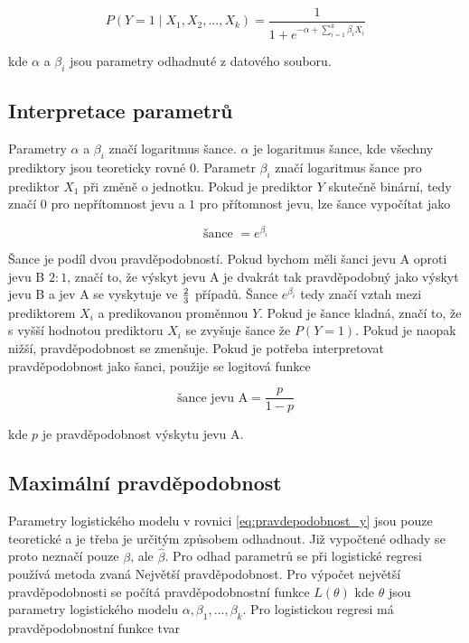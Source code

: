 \begin{equation}
    \label{eq:pravdepodobnost_y}
    P(Y = 1 \mid X_1, X_2, ..., X_k) = \frac{1}{1 + e^{-\alpha + \sum_{i=1}^k \beta_i X_i}}
\end{equation}

kde $\alpha$ a $\beta_i$ jsou parametry odhadnuté z datového souboru. 

\subsection{Interpretace parametrů}
Parametry $\alpha$ a $\beta_i$ značí logaritmus šance. $\alpha$ je  logaritmus šance, kde všechny prediktory
jsou teoreticky rovné $0$. Parametr $\beta_i$ značí logaritmus šance pro prediktor $X_1$ při změně o jednotku. 
Pokud je prediktor $Y$ skutečně binární, tedy značí $0$ pro nepřítomnost jevu a $1$ pro přítomnost jevu,
lze šance vypočítat jako

\begin{equation}
\text{šance } = e^{\beta_i}    
\end{equation}

Šance je podíl dvou pravděpodobností. Pokud bychom měli šanci jevu A oproti jevu B $2 : 1$, značí to, že výskyt jevu A je dvakrát tak pravděpodobný
jako výskyt jevu B a jev A se vyskytuje ve $2 \over 3$ případů. Šance $e^{\beta_i}$ tedy značí vztah mezi prediktorem $X_i$ a predikovanou proměnnou $Y$. Pokud je
šance kladná, značí to, že s vyšší hodnotou prediktoru $X_i$ se zvyšuje šance že $P(Y = 1)$. Pokud je naopak nižší, pravděpodobnost se zmenšuje. Pokud je potřeba
interpretovat pravděpodobnost jako šanci, použije se logitová funkce

\begin{equation}
    \label{eq:logitova_funkce}
    \text{šance jevu A} = \frac{p}{1 - p}
\end{equation}

kde $p$ je pravděpodobnost výskytu jevu A.

\subsection{Maximální pravděpodobnost}
Parametry logistického modelu v rovnici \ref{eq:pravdepodobnost_y} jsou pouze teoretické a je třeba je určitým způsobem odhadnout. Již vypočtené odhady
se proto neznačí pouze $\beta$, ale $\hat{\beta}$. Pro odhad parametrů se při logistické regresi používá metoda zvaná Největší pravděpodobnost. Pro výpočet
největší pravděpodobnosti se počítá pravděpodobnostní funkce $L(\theta)$ kde $\theta$ jsou parametry logistického modelu $\alpha, \beta_1, ..., \beta_k$.
Pro logistickou regresi má pravděpodobnostní funkce tvar

